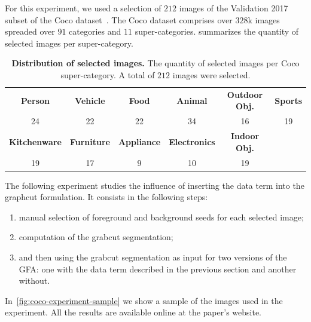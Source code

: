 \documentclass[review]{siamart220329}
\begin{document}
For this experiment, we used a selection of $212$ images of the Validation 2017
subset of the Coco dataset~\cite{lin2014microsoft}. The Coco dataset comprises
over $328$k images spreaded over $91$ categories and $11$ super-categories.
 summarizes the quantity of selected
images per super-category. 
%
%
\begin{table}
\footnotesize
    \caption{\textbf{Distribution of selected images.} The quantity of selected
    images per Coco super-category. A total of $212$ images were
    selected.}\label{tab:image-categories-distribution}
\begin{tabular}{cccccc}
\textbf{Person} & \textbf{Vehicle} & \textbf{Food} & \textbf{Animal} & \textbf{Outdoor Obj.} & \textbf{Sports} \\
24 & 22 & 22 & 34 & 16 & 19 \\[1em]
\textbf{Kitchenware} & \textbf{Furniture} & \textbf{Appliance} & \textbf{Electronics} & \textbf{Indoor Obj.} & \\
19 & 17 & 9 & 10 & 19 &
\end{tabular}
\end{table}
%
%
The following experiment studies the influence of inserting the data term into
the graphcut formulation. It consists in the following steps:
%
%
\begin{enumerate}
    \item{manual selection of foreground and background seeds for each selected
    image;} 
    \item{computation of the grabcut segmentation;} 
    \item{and then using the grabcut segmentation as input for two versions of
    the GFA: one with the data term described in the previous section and
    another without.}
\end{enumerate}
%
%
In~\cref{fig:coco-experiment-sample} we show a sample of the images used in the
experiment. All the results are available online at the paper's website.
\end{document}
